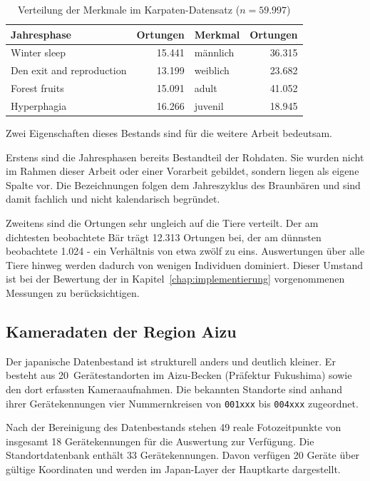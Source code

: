 \documentclass[12pt,a4paper]{report}
\begin{document}
\begin{table}[htbp]
\centering
\caption{Verteilung der Merkmale im Karpaten-Datensatz ($n = 59.997$)}
\label{tab:karpaten-merkmale}
\small
\begin{tabular}{l r l r}
\toprule
\textbf{Jahresphase} & \textbf{Ortungen} & \textbf{Merkmal} & \textbf{Ortungen} \\
\midrule
Winter sleep              & 15.441 & männlich  & 36.315 \\
Den exit and reproduction & 13.199 & weiblich  & 23.682 \\
Forest fruits             & 15.091 & adult     & 41.052 \\
Hyperphagia               & 16.266 & juvenil   & 18.945 \\
\bottomrule
\end{tabular}
\end{table}

Zwei Eigenschaften dieses Bestands sind für die weitere Arbeit bedeutsam.

Erstens sind die Jahresphasen bereits Bestandteil der Rohdaten. Sie wurden nicht im Rahmen
dieser Arbeit oder einer Vorarbeit gebildet, sondern liegen als eigene Spalte vor. Die
Bezeichnungen folgen dem Jahreszyklus des Braunbären und sind damit fachlich und nicht
kalendarisch begründet.

Zweitens sind die Ortungen sehr ungleich auf die Tiere verteilt. Der am dichtesten
beobachtete Bär trägt 12.313 Ortungen bei, der am dünnsten beobachtete 1.024 - ein
Verhältnis von etwa zwölf zu eins. Auswertungen über alle Tiere hinweg werden dadurch von
wenigen Individuen dominiert. Dieser Umstand ist bei der Bewertung der in
Kapitel~\ref{chap:implementierung} vorgenommenen Messungen zu berücksichtigen.



\subsection{Kameradaten der Region Aizu}
\label{subsec:japandaten}

Der japanische Datenbestand ist strukturell anders und deutlich kleiner. Er besteht aus
20~Gerätestandorten im Aizu-Becken (Präfektur Fukushima) sowie den dort erfassten
Kameraaufnahmen. Die bekannten Standorte sind anhand ihrer
Gerätekennungen vier Nummernkreisen von
\texttt{001xxx} bis \texttt{004xxx} zugeordnet.



Nach der Bereinigung des Datenbestands stehen
49 reale Fotozeitpunkte von insgesamt
18 Gerätekennungen für die Auswertung zur Verfügung.
Die Standortdatenbank enthält 33 Gerätekennungen.
Davon verfügen 20 Geräte über gültige Koordinaten
und werden im Japan-Layer der Hauptkarte dargestellt.
\end{document}
